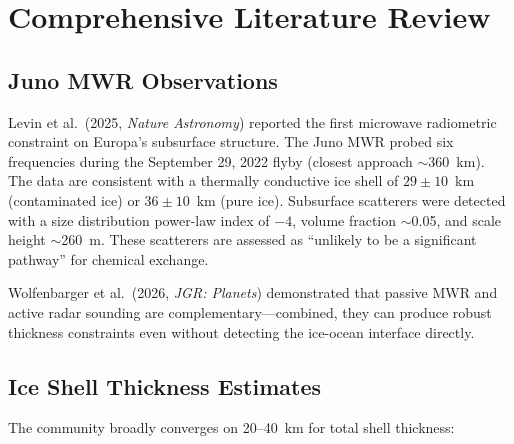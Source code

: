 \documentclass[11pt,letterpaper]{article}
\begin{document}
\newpage
\appendix

\section{Comprehensive Literature Review}
\label{app:literature}

\subsection{Juno MWR Observations}

Levin et al.\ (2025, \textit{Nature Astronomy}) reported the first microwave radiometric constraint on Europa's subsurface structure. The Juno MWR probed six frequencies during the September 29, 2022 flyby (closest approach $\sim$360~km). The data are consistent with a thermally conductive ice shell of $29 \pm 10$~km (contaminated ice) or $36 \pm 10$~km (pure ice). Subsurface scatterers were detected with a size distribution power-law index of $-4$, volume fraction $\sim$0.05, and scale height $\sim$260~m. These scatterers are assessed as ``unlikely to be a significant pathway'' for chemical exchange.

Wolfenbarger et al.\ (2026, \textit{JGR: Planets}) demonstrated that passive MWR and active radar sounding are complementary---combined, they can produce robust thickness constraints even without detecting the ice-ocean interface directly.

\subsection{Ice Shell Thickness Estimates}

The community broadly converges on 20--40~km for total shell thickness:
\end{document}
